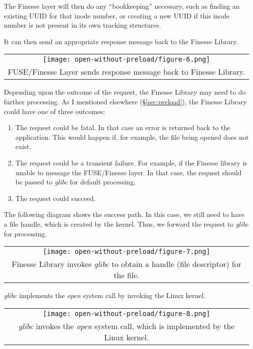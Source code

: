 \documentclass[a4paper,11pt]{article}
\begin{document}
The Finesse layer will then do any ``bookkeeping'' necessary, such as finding an existing UUID for that inode number, or creating a new UUID if this inode number is not present in its own tracking structures.

It can then send an appropriate response message back to the Finesse Library.

\begin{tabular}{c}
    \texttt{[image: open-without-preload/figure-6.png]}
    \tabularnewline
    FUSE/Finesse Layer sends response message back to Finesse Library.
\end{tabular}

Depending upon the outcome of the request, the Finesse Library may need to do further processing.  As I mentioned elsewhere (\S \ref{sec:preload}), the Finesse Library could have one of three outcomes:

\begin{enumerate}
    \item The request could be fatal. In that case an error is returned back to the application.  This would happen if, for example, the file being opened does not exist.
    \item The request could be a transient failure.  For example, if the Finesse library is unable to message the FUSE/Finesse layer. In that case, the request should be passed to \textit{glibc} for default processing.
    \item The request could succeed.
\end{enumerate}

The following diagram shows the success path.  In this case, we still need to have a file handle, which is created by the kernel.  Thus, we forward the request to \textit{glibc} for processing.

\begin{tabular}{c}
    \texttt{[image: open-without-preload/figure-7.png]}
    \tabularnewline
    Finesse Library invokes \textit{glibc} to obtain a handle (file descriptor) for the file.
\end{tabular}

\textit{glibc} implements the \textit{open} system call by invoking the Linux kernel.

\begin{tabular}{c}
    \texttt{[image: open-without-preload/figure-8.png]}
    \tabularnewline
    \textit{glibc} invokes the \textit{open} system call, which is implemented by the Linux kernel.
\end{tabular}
\end{document}
